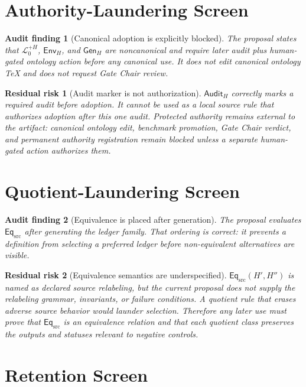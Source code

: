 \documentclass[11pt]{article}
\newcommand{\LangPlus}{\mathcal{L}_{0}^{+H}}
\newcommand{\GenH}{\mathsf{Gen}_{H}}
\newcommand{\EnvH}{\mathsf{Env}_{H}}
\newcommand{\EqSrc}{\mathsf{Eq}_{\mathrm{src}}}
\newcommand{\AuditH}{\mathsf{Audit}_{H}}
\newtheorem{auditfinding}{Audit finding}
\newtheorem{residualrisk}{Residual risk}
\begin{document}
\section{Authority-Laundering Screen}

\begin{auditfinding}[Canonical adoption is explicitly blocked]
The proposal states that \(\LangPlus\), \(\EnvH\), and \(\GenH\) are
noncanonical and require later audit plus human-gated ontology action before
any canonical use. It does not edit canonical ontology TeX and does not
request Gate Chair review.
\end{auditfinding}

\begin{residualrisk}[Audit marker is not authorization]
\(\AuditH\) correctly marks a required audit before adoption. It cannot be
used as a local source rule that authorizes adoption after this one audit.
Protected authority remains external to the artifact: canonical ontology
edit, benchmark promotion, Gate Chair verdict, and permanent authority
registration remain blocked unless a separate human-gated action authorizes
them.
\end{residualrisk}

\section{Quotient-Laundering Screen}

\begin{auditfinding}[Equivalence is placed after generation]
The proposal evaluates \(\EqSrc\) after generating the ledger family. That
ordering is correct: it prevents a definition from selecting a preferred
ledger before non-equivalent alternatives are visible.
\end{auditfinding}

\begin{residualrisk}[Equivalence semantics are underspecified]
\(\EqSrc(H',H'')\) is named as declared source relabeling, but the current
proposal does not supply the relabeling grammar, invariants, or failure
conditions. A quotient rule that erases adverse source behavior would
launder selection. Therefore any later use must prove that \(\EqSrc\) is an
equivalence relation and that each quotient class preserves the outputs and
statuses relevant to negative controls.
\end{residualrisk}

\section{Retention Screen}
\end{document}
